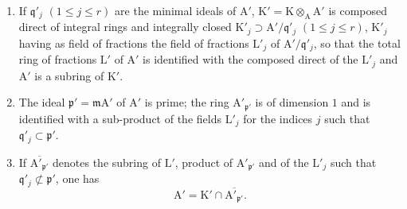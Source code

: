\begin{env}
\label{IV.6.14.1.2.env}
\begin{enumerate}[label=(\roman*)]
  \item If $\mathfrak{q}'_j$ $(1\leqslant j\leqslant r)$ are the minimal ideals of $\mathrm{A}'$, $\mathrm{K}'=\mathrm{K}\otimes_\mathrm{A}\mathrm{A}'$ is composed direct
of integral rings and integrally closed $\mathrm{K}'_j\supset\mathrm{A}'/\mathfrak{q}'_j$ $(1\leqslant j\leqslant r)$, $\mathrm{K}'_j$ having as field of fractions
the field of fractions $\mathrm{L}'_j$ of $\mathrm{A}'/\mathfrak{q}'_j$, so that the total ring of fractions $\mathrm{L}'$ of $\mathrm{A}'$
is identified with the composed direct of the $\mathrm{L}'_j$ and $\mathrm{A}'$ is a subring of $\mathrm{K}'$.
  \item The ideal $\mathfrak{p}'=\mathfrak{m}\mathrm{A}'$ of $\mathrm{A}'$ is prime; the ring $\mathrm{A}'_{\mathfrak{p}'}$ is of dimension $1$ and is identified
with a sub-product of the fields $\mathrm{L}'_j$ for the indices $j$ such that $\mathfrak{q}'_j\subset\mathfrak{p}'$.
  \item If $\overline{\mathrm{A}'_{\mathfrak{p}'}}$ denotes the subring of $\mathrm{L}'$, product of $\mathrm{A}'_{\mathfrak{p}'}$ and of the $\mathrm{L}'_j$ such that $\mathfrak{q}'_j\not\subset\mathfrak{p}'$, one has
\begin{equation}
\tag{6.14.1.3}
\label{IV.6.14.1.3}
  \mathrm{A}'=\mathrm{K}'\cap\overline{\mathrm{A}'_{\mathfrak{p}'}}.
\end{equation}
\end{enumerate}
\end{env}

